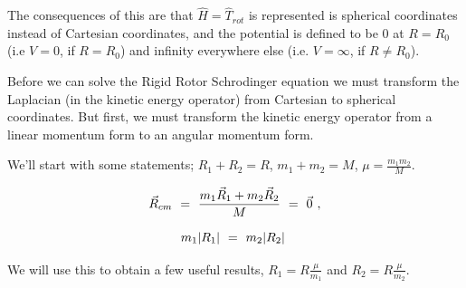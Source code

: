 \documentclass{article}
\begin{document}
The consequences of this are that \begin{math} \hat{H} = \hat{T}_{rot}  \end{math} is represented is spherical coordinates instead of Cartesian coordinates, and the potential is defined to be 0 at \begin{math} R = R_0  \end{math} (i.e \begin{math} V = 0 \end{math}, if \begin{math} R = R_0  \end{math}) and infinity everywhere else (i.e. \begin{math} V = \infty \end{math}, if \begin{math} R \neq R_0  \end{math}). 

Before we can solve the Rigid Rotor Schrodinger equation we must transform the Laplacian (in the kinetic energy operator) from Cartesian to spherical coordinates. But first, we must transform the kinetic energy operator from a linear momentum form to an angular momentum form. 

We'll start with some statements; \begin{math} R_1 + R_2 = R \end{math}, \begin{math} m_1 + m_2 = M \end{math}, \begin{math} \mu = \frac{m_1 m_2}{M} \end{math}.

\begin{equation} \label{eq:256}
\vec{R}_{cm} \hspace{0.125cm} = \hspace{0.125cm} \frac{m_1 \vec{R}_1 + m_2 \vec{R}_2}{M} \hspace{0.125cm} = \hspace{0.125cm} \vec{0} \hspace{0.125cm} ,
\end{equation}

\begin{equation} \label{eq:256}
 m_1 | R_1 | \hspace{0.125cm} = \hspace{0.125cm} m_2 | R_2 | \hspace{0.125cm} 
\end{equation}

We will use this to obtain a few useful results, \begin{math} R_1 = R \frac{\mu}{m_1} \end{math} and \begin{math} R_2 = R \frac{\mu}{m_2} \end{math}.
\end{document}
